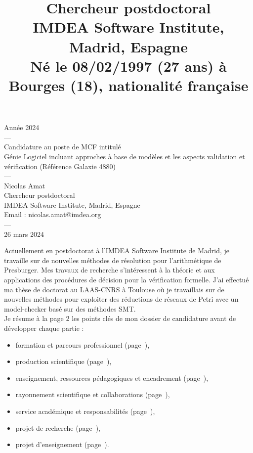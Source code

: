 \documentclass[11pt,a4paper]{moderncv}
\title{\normalsize  Chercheur postdoctoral\\
IMDEA Software Institute, Madrid, Espagne\\
Né le 08/02/1997 (27 ans) à Bourges (18), nationalité française\\
}
\begin{document}
\thispagestyle{empty}

\begin{center}
{\small Année 2024\\---\\
\huge Candidature au poste de MCF intitulé \\\og Génie Logiciel incluant approches à base de modèles et les aspects validation et vérification\fg\medbreak
\Large(Référence Galaxie 4880)\\
\small
---\\
\Large Nicolas Amat \\
\vspace{1em}
\small Chercheur postdoctoral\\
IMDEA Software Institute, Madrid, Espagne\\
    Email : nicolas.amat@imdea.org\\
---\\
26 mars 2024}
\end{center}

\newpage

\setcounter{page}{1}
\newpage

\makecvtitle

Actuellement en postdoctorat à l'IMDEA Software Institute de Madrid, je
travaille sur de nouvelles méthodes de résolution pour l'arithmétique de
Presburger. Mes travaux de recherche s'intéressent à la théorie et aux
applications des procédures de décision pour la vérification formelle. J'ai
effectué ma thèse de doctorat au LAAS-CNRS à Toulouse où je travaillais sur de
nouvelles méthodes pour exploiter des réductions de réseaux de Petri avec un
model-checker basé sur des méthodes SMT.\\

Je résume à la page 2 les points clés de mon dossier de candidature avant de
développer chaque partie :
\begin{itemize}
    \item formation et parcours professionnel (page~\pageref{sec:formation}),
    \item production scientifique (page~\pageref{sec:recherche}), 
    \item enseignement, ressources pédagogiques et encadrement (page~\pageref{sec:enseignements}),
    \item rayonnement scientifique et collaborations (page~\pageref{sec:rayonnement}),
    \item service académique et responsabilités (page~\pageref{sec:resp}),
    \item projet de recherche (page~\pageref{sec:projet_recherche}),
    \item projet d'enseignement (page~\pageref{sec:projet_enseignement}).\\
\end{itemize}
\end{document}
